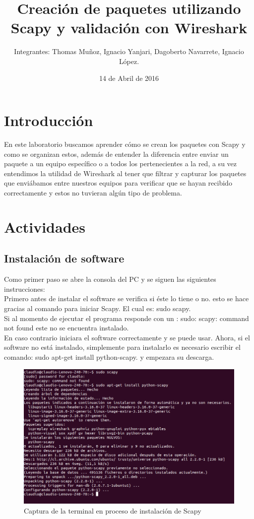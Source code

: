 \documentclass{udpreport}
\title{Creación de paquetes utilizando Scapy y validación con Wireshark}
\author{Integrantes: Thomas Muñoz, Ignacio Yanjari, Dagoberto Navarrete, Ignacio López.}
\date{14 de Abril de 2016}
\begin{document}
\maketitle
\tableofcontents
\listoffigures
\chapter{Introducción}
	En este laboratorio buscamos aprender cómo se crean los paquetes con Scapy y como se organizan estos, además de entender la
	diferencia entre enviar un paquete a un equipo específico o a todos los pertenecientes a la red, a su vez entendimos la
	utilidad de Wireshark al tener que filtrar y capturar los paquetes que enviábamos entre nuestros equipos para verificar que se
	hayan recibido correctamente y estos no tuvieran algún tipo de problema.
\chapter{Actividades}
	\section{Instalación de software}
	Como primer paso se abre la consola del PC y se siguen las siguientes instrucciones:\\
	Primero antes de instalar el software se  verifica si éste lo tiene o no.
	esto se hace gracias al comando para iniciar Scapy. El cual es: sudo scapy.\\
	Si al momento de ejecutar el programa responde con un :  sudo: scapy: command not found 
	este no se encuentra instalado. \\
	En caso contrario iniciara el software correctamente y se puede usar.
	Ahora, si el software no está instalado, simplemente para instalarlo
	es necesario escribir el comando: sudo apt-get install python-scapy.
	y empezara su descarga.\\
	\begin{figure}[h]
	\centering
	\includegraphics[width=\textwidth]{Instalacion.png}
	\caption{Captura de la terminal en proceso de instalación de Scapy}
	\end{figure}\\
\end{document}
